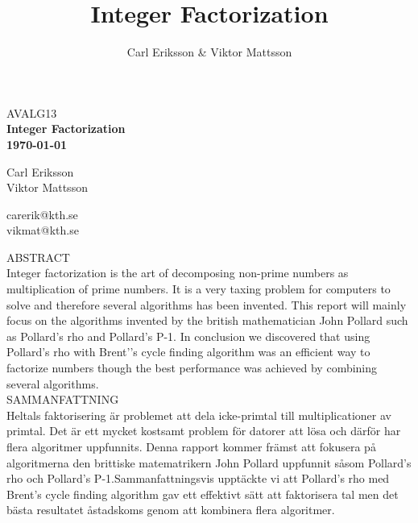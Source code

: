\documentclass[a4paper,12pt]{article}
\author{Carl Eriksson & Viktor Mattsson}
\begin{document}
\title{Integer Factorization}   
    
	\begin{titlepage}
    	\centering
    	\small
    	AVALG13\\
    	\vspace*{6\baselineskip}
    	\Large
    	\bfseries
    	Integer Factorization\\
    	\normalsize
        \textbf{\today} \\[2\baselineskip]

        \begin{minipage}{0.4\textwidth}
        \begin{flushleft} 
        Carl Eriksson\\
        Viktor Mattsson\\
        \end{flushleft}
        \end{minipage}
        \begin{minipage}{0.25\textwidth}
        \begin{flushleft} 
        carerik@kth.se\\
        vikmat@kth.se\\
        \end{flushleft}
        \end{minipage}

        \vspace*{10\baselineskip}
    \end{titlepage}

    \newpage

    ABSTRACT\\

    Integer factorization is the art of decomposing non-prime numbers as multiplication of prime numbers. It is a very taxing problem for computers to solve and therefore several algorithms has been invented. This report will mainly focus on the algorithms invented by the british mathematician John Pollard such as Pollard’s rho and Pollard’s P-1. In conclusion we discovered that using Pollard’s rho with Brent’’s cycle finding algorithm was an efficient way to factorize numbers though the best performance was achieved by combining several algorithms.\\

    SAMMANFATTNING\\

    Heltals faktorisering är problemet att dela icke-primtal till multiplicationer av primtal. Det är ett mycket kostsamt problem för datorer att lösa och därför har flera algoritmer uppfunnits. Denna rapport kommer främst att fokusera på algoritmerna den brittiske matematrikern John Pollard uppfunnit såsom Pollard’s rho och Pollard’s P-1.Sammanfattningsvis upptäckte vi att Pollard’s rho med Brent’s cycle finding algorithm gav ett effektivt sätt att faktorisera tal men det bästa resultatet åstadskoms genom att kombinera flera algoritmer.
\end{document}
